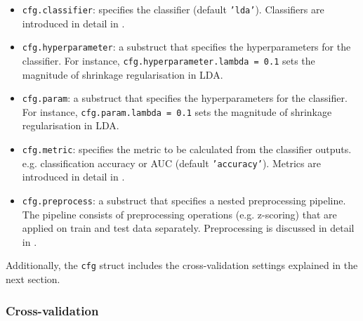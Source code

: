 \documentclass[utf8]{frontiersSCNS} %
\newcommand{\ttt}[1]{\texttt{#1}}
\begin{document}
\begin{itemize}
    \item \ttt{cfg.classifier}: specifies the classifier (default \ttt{'lda'}). Classifiers are introduced in detail in .
    \item \ttt{cfg.hyperparameter}: a substruct that specifies the hyperparameters for the classifier. For instance, \ttt{cfg.hyperparameter.lambda = 0.1} sets the magnitude of shrinkage regularisation in LDA.
    \item \ttt{cfg.param}: a substruct that specifies the hyperparameters for the classifier. For instance, \ttt{cfg.param.lambda = 0.1} sets the magnitude of shrinkage regularisation in LDA.
    \item \ttt{cfg.metric}: specifies the metric to be calculated from the classifier outputs. e.g. classification accuracy or AUC (default \ttt{'accuracy'}). Metrics are introduced in detail in .
    \item \ttt{cfg.preprocess}: a substruct that specifies a nested preprocessing pipeline. The pipeline consists of preprocessing operations (e.g. z-scoring) that are applied on train and test data separately. Preprocessing is discussed in detail in .
\end{itemize}

Additionally, the \ttt{cfg} struct includes the cross-validation settings explained in the next section.


\subsubsection{Cross-validation}
\end{document}
